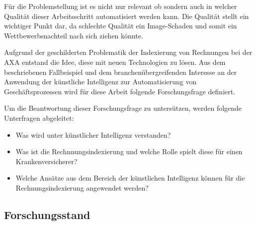\documentclass{hwz}
\begin{document}
Für die Problemstellung ist es nicht nur relevant ob sondern auch in welcher Qualität dieser Arbeitsschritt automatisiert werden kann. Die Qualität stellt ein wichtiger Punkt dar, da schlechte Qualität ein Image-Schaden und somit ein Wettbewerbsnachteil nach sich ziehen könnte.

Aufgrund der geschilderten Problematik der Indexierung von Rechnungen bei der AXA entstand die Idee, diese mit neuen Technologien zu lösen. Aus dem beschriebenen Fallbeispiel und dem branchenübergreifenden Interesse an der Anwendung der künstliche Intelligenz zur Automatisierung von Geschäftsprozessen wird für diese Arbeit folgende Forschungsfrage definiert.

{
    \medskip
    \setlength{\fboxsep}{1em}
    \noindent{}
    \medskip
}

Um die Beantwortung dieser Forschungsfrage zu untersützen, werden folgende Unterfragen abgeleitet:

\begin{itemize}
    \item Was wird unter künstlicher Intelligenz verstanden?
    \item Was ist die Rechnnungsindexierung und welche Rolle spielt diese für einen Krankenversicherer?
    \item Welche Ansätze aus dem Bereich der künstlichen Intelligenz können für die Rechnungsindexierung angewendet werden?
\end{itemize}

%
%
%
%
%
%
%
%
%
%
%

\subsection{Forschungsstand}

\end{document}
